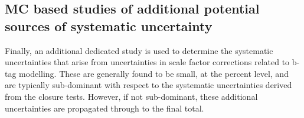 \subsection{MC based studies of additional potential sources of
systematic uncertainty}
\label{sec:closure-tests-desc}




Finally, an additional dedicated study is used to determine the
systematic uncertainties that arise from uncertainties in scale factor
corrections related to b-tag modelling. These are generally found to
be small, at the percent level, and are typically sub-dominant with
respect to the systematic uncertainties derived from the closure
tests. However, if not sub-dominant, these additional uncertainties
are propagated through to the final total.
